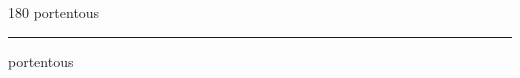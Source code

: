 
\begin{frame}
\begin{center}
\begin{turn}{180}
{\fontsize{2.5cm}{1em}\selectfont portentous}
\end{turn}
\vspace{1em}\par  
\hrule
\vspace{1em}\par  
{\fontsize{2.5cm}{1em}\selectfont portentous}
\end{center}
\end{frame}
